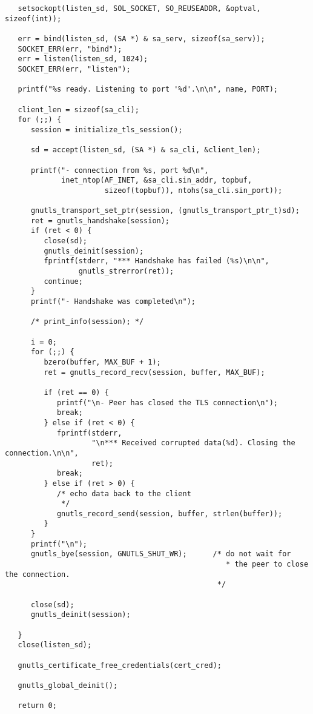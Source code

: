 \begin{verbatim}
   setsockopt(listen_sd, SOL_SOCKET, SO_REUSEADDR, &optval, sizeof(int));

   err = bind(listen_sd, (SA *) & sa_serv, sizeof(sa_serv));
   SOCKET_ERR(err, "bind");
   err = listen(listen_sd, 1024);
   SOCKET_ERR(err, "listen");

   printf("%s ready. Listening to port '%d'.\n\n", name, PORT);

   client_len = sizeof(sa_cli);
   for (;;) {
      session = initialize_tls_session();

      sd = accept(listen_sd, (SA *) & sa_cli, &client_len);

      printf("- connection from %s, port %d\n",
             inet_ntop(AF_INET, &sa_cli.sin_addr, topbuf,
                       sizeof(topbuf)), ntohs(sa_cli.sin_port));

      gnutls_transport_set_ptr(session, (gnutls_transport_ptr_t)sd);
      ret = gnutls_handshake(session);
      if (ret < 0) {
         close(sd);
         gnutls_deinit(session);
         fprintf(stderr, "*** Handshake has failed (%s)\n\n",
                 gnutls_strerror(ret));
         continue;
      }
      printf("- Handshake was completed\n");

      /* print_info(session); */

      i = 0;
      for (;;) {
         bzero(buffer, MAX_BUF + 1);
         ret = gnutls_record_recv(session, buffer, MAX_BUF);

         if (ret == 0) {
            printf("\n- Peer has closed the TLS connection\n");
            break;
         } else if (ret < 0) {
            fprintf(stderr,
                    "\n*** Received corrupted data(%d). Closing the connection.\n\n",
                    ret);
            break;
         } else if (ret > 0) {
            /* echo data back to the client
             */
            gnutls_record_send(session, buffer, strlen(buffer));
         }
      }
      printf("\n");
      gnutls_bye(session, GNUTLS_SHUT_WR);      /* do not wait for
                                                   * the peer to close the connection.
                                                 */

      close(sd);
      gnutls_deinit(session);

   }
   close(listen_sd);

   gnutls_certificate_free_credentials(cert_cred);

   gnutls_global_deinit();

   return 0;


\end{verbatim}
